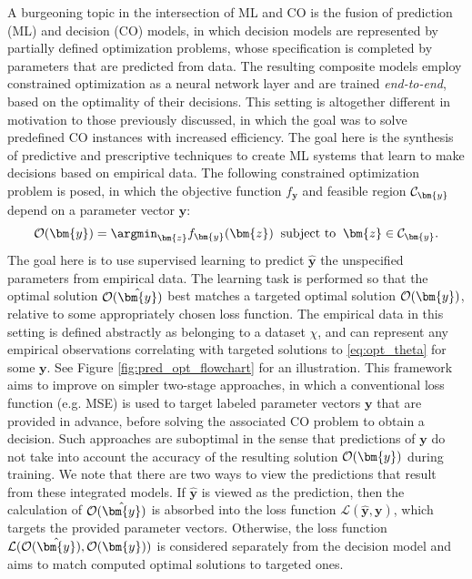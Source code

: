 A burgeoning topic in the intersection of ML and CO is the fusion of prediction (ML) and decision (CO) models, in which  decision models are represented by partially defined optimization problems, whose specification is completed by parameters that are predicted from data. The resulting composite models employ constrained optimization as a neural network layer and are trained \emph{end-to-end}, based on the optimality of their decisions. This setting is altogether different in motivation to those previously discussed, in which the goal was to solve predefined CO instances with increased efficiency. The goal here is the synthesis of predictive and prescriptive techniques to create ML systems that learn to make decisions based on empirical data.
The following constrained optimization problem is posed, in which the objective function $f_{\bm{y}}$ and feasible region ${\cal C}_{\bm{y}}$ depend on a parameter vector $\bm{y}$:
\begin{equation}
\label{eq:opt_theta}
\mathcal{O}(\bm{y}) = \argmin_{\bm{z}} f_{\bm{y}}(\bm{z}) \;\; 
  \text{subject to} \;\;
  \bm{z} \in \mathcal{C}_{\bm{y}}.
\end{equation}
The goal here is to use supervised learning to predict $\hat{\bm{y}}$ the unspecified parameters from empirical data. The learning task is performed so that the optimal solution ${\cal O}(\hat{\bm{y}})$ best matches a targeted optimal solution ${\cal O}(\bm{y})$, relative to some appropriately chosen loss function. The empirical data in this setting is defined abstractly as belonging to a dataset $\chi$, and can represent any empirical observations correlating with targeted solutions to \eqref{eq:opt_theta} for some $\bm{y}$. See Figure \ref{fig:pred_opt_flowchart} for an illustration.
This framework aims to improve on simpler two-stage approaches, in which a conventional loss function (e.g. MSE) is used to target labeled parameter vectors $\bm{y}$ that are provided in advance, before solving the associated CO problem to obtain a decision. Such approaches are suboptimal in the sense that predictions of $\bm{y}$ do not take into account the accuracy of the resulting solution ${\cal O}(\bm{y})$ during training.
We note that there are two ways to view the predictions that result from these integrated models. If $\hat{\bm{y}}$ is viewed as the prediction, then the calculation of ${\cal O}(\hat{\bm{y}})$ is absorbed into the loss function $\mathcal{L}(\hat{\bm{y}},\bm{y})$, which targets the provided parameter vectors. Otherwise, the loss function $\mathcal{L}( {\cal O}(\hat{\bm{y}}) , {\cal O}(\bm{y}))$ is considered separately from the decision model and aims to match computed optimal solutions to targeted ones. 
